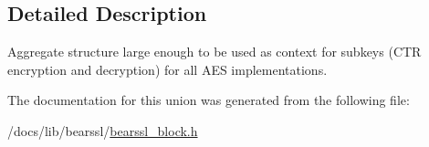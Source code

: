 \subsection{Detailed Description}
Aggregate structure large enough to be used as context for subkeys (C\+TR encryption and decryption) for all A\+ES implementations. 

The documentation for this union was generated from the following file\+:\begin{DoxyCompactItemize}
\item 
/docs/lib/bearssl/\hyperlink{bearssl__block_8h}{bearssl\+\_\+block.\+h}\end{DoxyCompactItemize}
